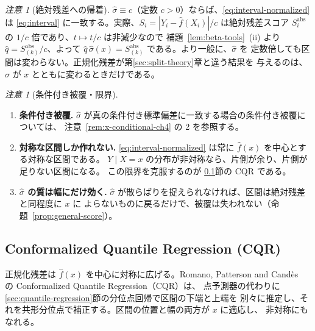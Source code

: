 \documentclass[a4paper,11pt]{jsarticle}
\theoremstyle{definition}
\theoremstyle{plain}
\theoremstyle{remark}
\newtheorem{remark}[definition]{注意}
\newcommand{\qhat}{\hat{q}}
\newcommand{\fhat}{\hat{f}}
\begin{document}
\begin{remark}[絶対残差への帰着]
  \label{rem:normalized-reduction}
  $\hat\sigma\equiv c$（定数 $c>0$）ならば、\eqref{eq:interval-normalized} は
  \eqref{eq:interval} に一致する。実際、$S_i=|Y_i-\fhat(X_i)|/c$ は絶対残差スコア
  $S_i^{\mathrm{abs}}$ の $1/c$ 倍であり、$t\mapsto t/c$ は非減少なので
  補題~\ref{lem:beta-tools}~(ii) より $\qhat=S^{\mathrm{abs}}_{(k)}/c$、よって
  $\qhat\,\hat\sigma(x)=S^{\mathrm{abs}}_{(k)}$ である。より一般に、$\hat\sigma$ を
  定数倍しても区間は変わらない。正規化残差が第\ref{sec:split-theory}章と違う結果を
  与えるのは、$\hat\sigma$ が $x$ とともに変わるときだけである。
\end{remark}

\begin{remark}[条件付き被覆・限界]
  \label{rem:normalized-limits}
  \leavevmode
  \begin{enumerate}
    \item \textbf{条件付き被覆.}
      $\hat\sigma$ が真の条件付き標準偏差に一致する場合の条件付き被覆については、
      注意~\ref{rem:x-conditional-ch4} の 2 を参照する。
    \item \textbf{対称な区間しか作れない.}
      \eqref{eq:interval-normalized} は常に $\fhat(x)$ を中心とする対称な区間である。
      $Y\mid X=x$ の分布が非対称なら、片側が余り、片側が足りない区間になる。
      この限界を克服するのが \ref{sec:cqr}節の CQR である。
    \item \textbf{$\hat\sigma$ の質は幅にだけ効く.}
      $\hat\sigma$ が散らばりを捉えられなければ、区間は絶対残差と同程度に $x$ に
      よらないものに戻るだけで、被覆は失われない（命題~\ref{prop:general-score}）。
  \end{enumerate}
\end{remark}

\subsection{Conformalized Quantile Regression (CQR)}
\label{sec:cqr}

正規化残差は $\fhat(x)$ を中心に対称に広げる。Romano, Patterson and
Cand\`es~\cite{romano2019cqr} の Conformalized Quantile Regression（CQR）は、
点予測器の代わりに \ref{sec:quantile-regression}節の分位点回帰で区間の下端と上端を
別々に推定し、それを共形分位点で補正する。区間の位置と幅の両方が $x$ に適応し、
非対称にもなれる。
\end{document}
